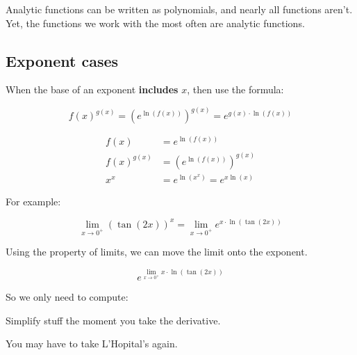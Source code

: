 \documentclass[12pt]{article}
\theoremstyle{plain}
\theoremstyle{remark}
\theoremstyle{definition}
\begin{document}
Analytic functions can be written as polynomials, and nearly all
functions aren't. Yet, the functions we work with the most often are
analytic functions.


\subsection{Exponent cases}

When the base of an exponent \textbf{includes} \(x\), then use the
formula:

\[f(x)^{g(x)} = \left( e^{\ln\left( f(x) \right)} \right)^{g(x)} = e^{g(x) \cdot \ln\left( f(x) \right)}\]

\begin{align*}
f(x) &= e^{\ln\left( f(x) \right)} \\
f(x)^{g(x)} &= \left( e^{\ln\left( f(x) \right)} \right)^{g(x)} \\
x^{x} &= e^{\ln\left( x^{x} \right)} = e^{x\ln(x)}
\end{align*}


For example:

\[\lim_{x \rightarrow 0^{+}}\left( \tan(2x) \right)^{x} = \lim_{x \rightarrow 0^{+}}e^{x \cdot \ln\left( \tan(2x) \right)}\]

Using the property of limits, we can move the limit onto the exponent.

\[e^{\lim_{x \rightarrow 0^{+}}{x \cdot \ln\left( \tan(2x) \right)}}\]

So we only need to compute:


Simplify stuff the moment you take the derivative.


You may have to take L'Hopital's again.
\end{document}
